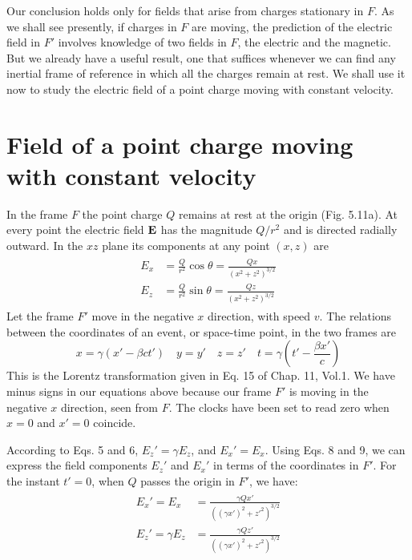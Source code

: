 Our conclusion holds only for fields that arise from charges stationary
in $F$. As we shall see presently, if charges in $F$ are moving, the prediction
of the electric field in $F'$ involves knowledge of two fields in $F$,
the electric and the magnetic. But we already have a useful result,
one that suffices whenever we can find any inertial frame of reference
in which all the charges remain at rest. We shall use it now to study
the electric field of a point charge moving with constant velocity.

\section{Field of a point charge moving with constant velocity}
In the frame $F$ the point charge $Q$ remains at rest at the origin
(Fig. 5.11a). At every point the electric field $\mathbf{E}$ has the magnitude
$Q/r^2$ and is directed radially outward. In the $xz$ plane its components
at any point $(x,z)$ are
\begin{align}
\begin{split}
  E_x &= \frac{Q}{r^2}\cos\theta = \frac{Qx}{(x^2+z^2)^{3/2}} \\
  E_z &= \frac{Q}{r^2}\sin\theta = \frac{Qz}{(x^2+z^2)^{3/2}} 
\end{split}
\end{align}
Let the frame $F'$ move in the negative $x$ direction, with speed $v$. The
relations between the coordinates of an event, or space-time point,
in the two frames are
\begin{equation}
  x=\gamma(x'-\beta c t') \quad y=y' \quad z=z' \quad t=\gamma\left(t'-\frac{\beta x'}{c}\right)
\end{equation}
This is the Lorentz transformation given in Eq. 15 of Chap. 11, Vol.1.
We have minus signs in our equations above because our frame $F'$ is
moving in the negative $x$ direction, seen from $F$. The clocks have
been set to read zero when $x=0$ and $x' = 0$ coincide.

According to Eqs. 5 and 6, $E_z' = \gamma E_z$, and $E_x'=E_x$. Using Eqs. 8
and 9, we can express the field components $E_z'$ and $E_x'$ in terms of the
coordinates in $F'$. For the instant $t' = 0$, when $Q$ passes the origin
in $F'$, we have:
\begin{align}
\begin{split}
  E_x' = E_x \;     &= \frac{\gamma Qx'}{((\gamma x')^2+z'^2)^{3/2}} \\
  E_z' = \gamma E_z &= \frac{\gamma Qz'}{((\gamma x')^2+z'^2)^{3/2}} 
\end{split}
\end{align}

